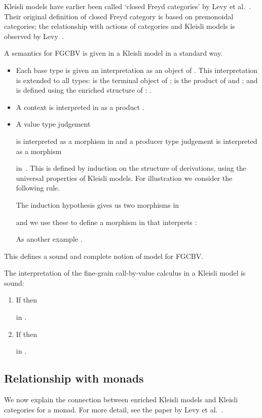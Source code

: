 \documentclass{LMCS}
\newcommand{\FGCBV}{FGCBV}
\begin{document}
Kleisli models have earlier been called
`closed Freyd categories' by Levy et al.~\cite{Levy:03}.
Their original definition of closed Freyd category is based
on premonoidal categories;
the relationship with actions of categories 
and Kleisli models is observed by Levy~\cite[B.10]{Levy:book}.

A semantics for {\FGCBV} is given in a Kleisli model in a standard way.
\begin{itemize}
\item Each base type is given an interpretation 
 as an object of .
This interpretation is extended to all types:
 is the terminal object of ;
 is the product of 
 and ;
and 
 is defined using the enriched
structure of :
.
\item 
A context  
is interpreted in  as a product 
. 
\item 
A value type judgement 
  
is interpreted as a 
morphism  in 
and a producer type judgement  
is interpreted as a morphism 

in~.
This is defined by induction on the structure of derivations,
using the universal properties of Kleisli models.
For illustration we consider the following rule.

The induction hypothesis gives us two morphisms in 

and we use these to define a morphism in  that interprets
:

As another example .

\end{itemize}
This defines a sound and complete notion of model for 
{\FGCBV}.
\begin{prop}
The interpretation of the 
fine-grain call-by-value calculus in a Kleisli model is sound:
\begin{enumerate}
\item If  then 

in .
\item If  then 

in .
\end{enumerate}
\end{prop}


\subsection{Relationship with monads}
\label{sec:monads}
We now explain the connection between enriched Kleisli models 
and Kleisli categories for a monad.
For more detail, see the paper by Levy et al.~\cite{Levy:03}.
\end{document}
